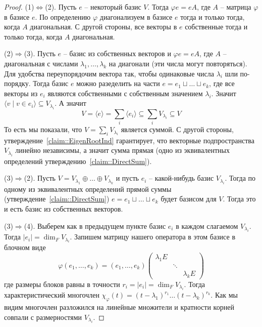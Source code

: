 \begin{proof}
(1)$\Leftrightarrow$(2). Пусть $e$ -- некоторый базис $V$. Тогда $\varphi e = e A$, где $A$ -- матрица $\varphi$ в базисе $e$. По определению $\varphi$ диагонализуем в базисе $e$ тогда и только тогда, когда $A$ диагональная. С другой стороны, все векторы в $e$ собственные тогда и только тогда, когда $A$ диагональная. 

(2)$\Rightarrow$(3). Пусть $e$ -- базис из собственных векторов и $\varphi e = e A$, где $A$ -- диагональная с числами $\lambda_1,\ldots,\lambda_k$ на диагонали (эти числа могут повторяться). Для удобства переупорядочим вектора так, чтобы одинаковые числа $\lambda_i$ шли по-порядку. Тогда базис $e$ можно разеделить на части $e = e_1 \sqcup \ldots \sqcup e_k$, где все векторы из $e_i$ являются собственными с собственным значением $\lambda_i$. Значит $\langle v\mid v\in e_i\rangle\subseteq V_{\lambda_i}$. А значит 
\[
V = \langle e \rangle = \sum_i \langle e_i\rangle \subseteq  \sum_i V_{\lambda_i} \subseteq V
\]
То есть мы показали, что $V = \sum_i V_{\lambda_i}$ является суммой. С другой стороны, утверждение~\ref{claim::EigenRootInd} гарантирует, что векторные подпространства $V_{\lambda_i}$ линейно независимы, а значит сумма прямая (одно из эквивалентных определений утверждению~\ref{claim::DirectSum}).

(3)$\Rightarrow$(2). Пусть $V = V_{\lambda_1}\oplus \ldots \oplus V_{\lambda_k}$ и пусть $e_i$ -- какой-нибудь базис $V_{\lambda_i}$. Тогда по одному из эквивалентных определений прямой суммы (утверждение~\ref{claim::DirectSum}) $e = e_1 \sqcup\ldots \sqcup e_k$ будет базисом для $V$. Тогда это и есть базис из собственных векторов.

(3)$\Rightarrow$(4). Выберем как в предыдущем пункте базис $e_i$ в каждом слагаемом $V_{\lambda_i}$. Тогда $|e_i| = \dim_F V_{\lambda_i}$. Запишем матрицу нашего оператора в этом базисе в блочном виде
\[
\varphi(e_1,\ldots,e_k)
=
(e_1,\ldots,e_k)
\begin{pmatrix}
{\lambda_1 E}&{}&{}\\
{}&{\ddots}&{}\\
{}&{}&{\lambda_k E}
\end{pmatrix}
\]
где размеры блоков равны в точности $r_i=|e_i| = \dim_F V_{\lambda_i}$. Тогда характеристический многочлен $\chi_\varphi(t) = (t-\lambda_1)^{r_1}\ldots(t-\lambda_k)^{r_k}$. Как мы видим многочлен разложился на линейные множители и кратности корней совпали с размерностями $V_{\lambda_i}$.


\end{proof}
